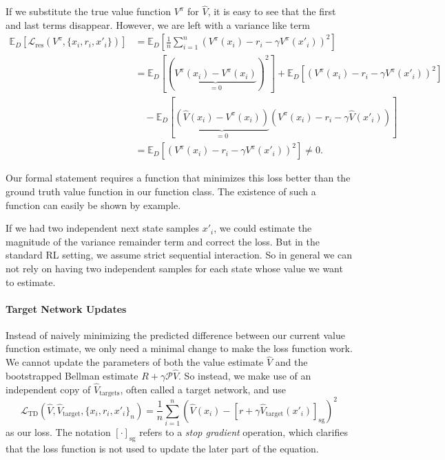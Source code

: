 If we substitute the true value function $V^\pi$ for $\hat{V}$, it is easy to see that the first and last terms disappear.
However, we are left with a variance like term
\begin{align}
    \mathbb{E}_{D} \left[\mathcal{L}_\mathrm{res}(V^\pi, \{x_i, r_i, x'_i\})\right] &= \mathbb{E}_{D} \left[\frac{1}{n} \sum_{i=1}^n \left(V^\pi(x_i) - r_i - \gamma V^\pi(x'_i)\right)^2\right] \\
    &=\mathbb{E}_{D} \left[\left(\underbrace{V^\pi(x_i) - V^\pi(x_i)}_{=0}\right)^2\right] + \mathbb{E}_{D}\left[\left( V^\pi(x_i) - r_i - \gamma V^\pi(x'_i)\right)^2\right] \\
    &\quad - \mathbb{E}_{D}\left[\underbrace{\left(\hat{V}(x_i) - V^\pi(x_i)\right)}_{=0}\left( V^\pi(x_i) - r_i - \gamma \hat{V}(x'_i)\right)\right]\\
    &=\mathbb{E}_{D}\left[\left( V^\pi(x_i) - r_i - \gamma V^\pi(x'_i)\right)^2\right] \neq 0.
\end{align}

Our formal statement requires a function that minimizes this loss better than the ground truth value function in our function class.
The existence of such a function can easily be shown by example.

If we had two independent next state samples $x'_i$, we could estimate the magnitude of the variance remainder term and correct the loss.
But in the standard RL setting, we assume strict sequential interaction.
So in general we can not rely on having two independent samples for each state whose value we want to estimate.

\paragraph{Target Network Updates}

Instead of naively minimizing the predicted difference between our current value function estimate, we only need a minimal change to make the loss function work.
We cannot update the parameters of both the value estimate $\hat{V}$ and the bootstrapped Bellman estimate $R + \gamma \mathcal{P} \hat{V}$.
So instead, we make use of an independent copy of $\hat{V}_\mathrm{targets}$, often called a target network, and use
\[
    \mathcal{L}_\mathrm{TD}\left(\hat{V}, \hat{V}_\mathrm{target}, \{x_i, r_i, x'_i\}_{n}\right) = \frac{1}{n} \sum_{i=1}^n \left(\hat{V}(x_i) - \left[r + \gamma \hat{V}_\mathrm{target}(x'_i)\right]_\mathrm{sg}\right)^2
\]
as our loss.
The notation $[\cdot]_\mathrm{sg}$ refers to a \emph{stop gradient} operation, which clarifies that the loss function is not used to update the later part of the equation.

